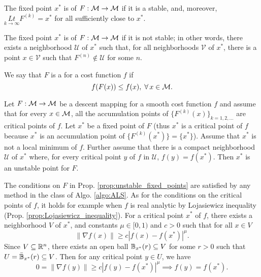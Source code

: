 \documentclass[11pt,a4paper]{article}
\begin{document}
\begin{definition}
The fixed point $x^*$ is  of $F:\mathcal{M}\rightarrow \mathcal{M}$ if it is a stable, and, moreover, $\underset{k\rightarrow\infty}{Lt}F^{(k)} = x^*$ for all sufficiently close to $x^*$. 
\end{definition}

\begin{definition}
The fixed point $x^*$ is  of $F:\mathcal{M}\rightarrow \mathcal{M}$ if it is not stable; in other words, there exists a neighborhood $\mathcal{U}$ of $x^*$ such that, for all neighborhoods $\mathcal{V}$ of $x^*$, there is a point $x\in \mathcal{V}$ such that $F^{(n)}\notin \mathcal{U}$ for some $n$.
\end{definition}

\begin{definition}
We say that $F$ is a  for a cost function $f$ if 
\begin{equation*}
f(F(x))\le f(x),\;\forall\,x\in\mathcal{M}.
\end{equation*}
\end{definition}

\begin{proposition} \label{prop:unstable_fixed_points}
Let $F:\mathcal{M}\rightarrow \mathcal{M}$ be a descent mapping for a smooth cost function $f$ and assume that for every $x\in \mathcal{M}$, all the accumulation points of $\{F^{(k)}(x)\}_{k = 1,2,\ldots}$ are critical points of $f$. Let $x^*$ be a fixed point of $F$ (thus $x^*$ is a critical point of $f$ because $x^*$ is an accumulation point of $\{F^{(k)}(x^*)\} = \{x^*\}$). Assume that $x^*$ is not a local minimum of $f$. Further assume that there is a compact neighborhood $\mathcal{U}$ of $x^*$ where, for every critical point $y$ of $f$ in $\mathcal{U}$, $f(y) = f(x^*)$. Then $x^*$ is an unstable point for $F$.
\end{proposition}

\begin{remark}
The conditions on $F$ in Prop. \ref{prop:unstable_fixed_points} are satisfied by any method in the class of Algo. \ref{algo:ALS}. As for the conditions on the critical points of $f$, it holds for example when $f$ is real analytic by Lojasiewicz inequality (Prop. \ref{prop:Lojasiewicz_inequality}). For a critical point $x^*$ of $f$, there exists a neighborhood $V$ of $x^*$, and constants $\mu\in[0,1)$ and $c>0$ such that for all $x\in V$
\begin{equation*}
\|\nabla f(x)\| \ge c|f(x)-f(x^*)|^\mu.
\end{equation*}
Since $V\subseteq \mathbb{R}^n$, there exists an open ball $\mathbb{B}_{x^*}(r)\subseteq V$ for some $r>0$ such that $U = \bar{\mathbb{B}}_{x^*}(r)\subseteq V$. Then for any critical point $y\in U$, we have
\begin{equation*}
0 = \|\nabla f(y)\| \ge c|f(y)-f(x^*)|^\mu \implies f(y) = f(x^*).
\end{equation*}
\end{remark}
\end{document}
